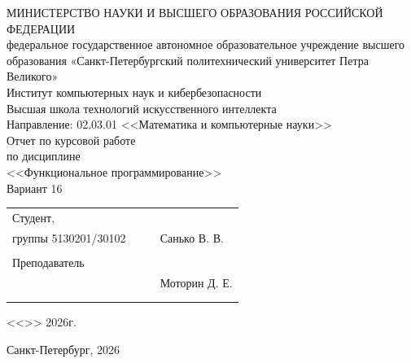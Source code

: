 \documentclass[a4paper,12pt]{article}
\begin{document}
	
	\begin{center}
		\hfill \break
		\hfill \break
		\normalsize{МИНИСТЕРСТВО НАУКИ И ВЫСШЕГО ОБРАЗОВАНИЯ РОССИЙСКОЙ ФЕДЕРАЦИИ\\
			федеральное государственное автономное образовательное учреждение высшего образования «Санкт-Петербургский политехнический университет Петра Великого»\\[10pt]}
		\normalsize{Институт компьютерных наук и кибербезопасности}\\[10pt] 
		\normalsize{Высшая школа технологий искусственного интеллекта}\\[10pt] 
		\normalsize{Направление: 02.03.01 <<Математика и компьютерные науки>>}\\
		
		\hfill \break
		\hfill \break
		\hfill \break
		\hfill \break
		\large{Отчет по курсовой работе }\\
		\large{по дисциплине}\\
		\large{<<Функциональное программирование>>}\\
		\large{Вариант 16}\\
		\hfill \break
	\end{center}
	
	\vspace{3cm}
	\small{ 
		\begin{tabular}{lrrl}
			\!\!\!Студент, & \hspace{2cm} & & \\
			\!\!\!группы 5130201/30102 & \hspace{2cm} & \underline{\hspace{3cm}} &Санько В. В. \\\\
			\!\!\!Преподаватель\\ \hspace{-5pt} & \hspace{2cm} &  \underline{\hspace{3cm}} &  Моторин Д. Е. \\\\
			&&\hspace{4cm}
		\end{tabular}
		\begin{flushright}
			<<\underline{\hspace{1cm}}>>\underline{\hspace{2.5cm}} 2026г.
		\end{flushright}
	}
	
	\hfill \break
	\vspace{3cm}
	\begin{center} \small{Санкт-Петербург, 2026} \end{center}
	\thispagestyle{empty}
	
\end{document}

